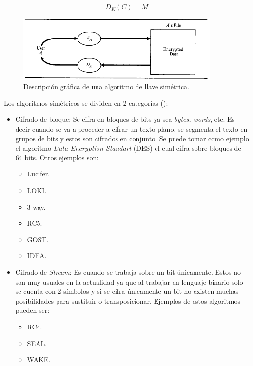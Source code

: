 \begin{equation}\label{eqDescifradoSimetrico}
D_K (C) = M
\end{equation}


\begin{figure}
	\centering
	\includegraphics[width=0.9\textwidth]{./images/figSimmetricKeyAlgorithm}
	\caption{Descripción gráfica de una algoritmo de llave simétrica.}
	\label{figSimmetricKeyAlgorithm}
\end{figure}


Los algoritmos simétricos se dividen en 2 categorías (\cite{bruce}):

\begin{itemize}
\item Cifrado de bloque: Se cifra en bloques de bits ya sea \textit{bytes, words}, etc. Es decir cuando se va a proceder a cifrar un texto plano, se segmenta el texto en grupos de bits y estos son cifrados en conjunto. Se puede tomar como ejemplo el algoritmo \textit{Data Encryption Standart} (DES) el cual cifra sobre bloques de 64 bits. Otros ejemplos son:
\begin{itemize}
\item Lucifer.
\item LOKI.
\item 3-way.
\item RC5.
\item GOST.
\item IDEA.
\end{itemize}

\item Cifrado de \textit{Stream}: Es cuando se trabaja sobre un bit únicamente. Estos no son muy usuales en la actualidad ya que al trabajar en lenguaje binario solo se cuenta con 2 símbolos y si se cifra únicamente un bit no existen muchas posibilidades para sustituir o transposicionar.
Ejemplos de estos algoritmos pueden ser:
\begin{itemize}
\item RC4.
\item SEAL.
\item WAKE.
\end{itemize}
\end{itemize}

